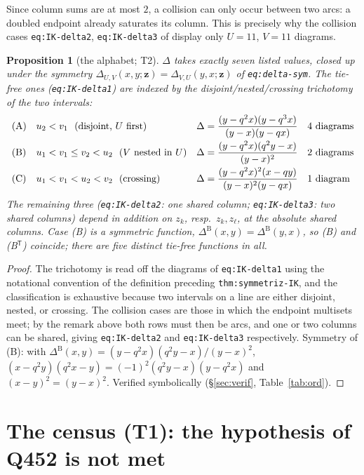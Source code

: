 \documentclass[11pt]{article}
\theoremstyle{plain}
\newtheorem{prop}[thm]{Proposition}
\theoremstyle{definition}
\newcommand{\Dl}{\Delta}
\newcommand{\bz}{\bm{z}}
\begin{document}
Since column sums are at most $2$, a collision can only occur between two arcs:
a doubled endpoint already saturates its column. This is precisely why the
collision cases \texttt{eq:IK-delta2}, \texttt{eq:IK-delta3} of \cite{GGW}
display only $U=11$, $V=11$ diagrams.

\begin{prop}[the alphabet; T2]\label{prop:alphabet}
$\Dl$ takes exactly seven listed values, closed up under the symmetry
$\Dl_{U,V}(x,y;\bz)=\Dl_{V,U}(y,x;\bz)$ of \texttt{eq:delta-sym}. The
\emph{tie-free} ones (\texttt{eq:IK-delta1}) are indexed by the
disjoint/nested/crossing trichotomy of the two intervals:
\[
\begin{array}{llll}
\textup{(A)} & u_2<v_1 \textup{ \ (disjoint, $U$ first)} &
\Dl=\dfrac{(y-q^2x)(y-q^3x)}{(y-x)(y-qx)} & \textup{4 diagrams}\\[3mm]
\textup{(B)} & u_1<v_1\le v_2<u_2 \textup{ \ ($V$ nested in $U$)} &
\Dl=\dfrac{(y-q^2x)(q^2y-x)}{(y-x)^2} & \textup{2 diagrams}\\[3mm]
\textup{(C)} & u_1<v_1<u_2<v_2 \textup{ \ (crossing)} &
\Dl=\dfrac{(y-q^2x)^2(x-qy)}{(y-x)^2(y-qx)} & \textup{1 diagram}
\end{array}
\]
The remaining three (\texttt{eq:IK-delta2}: one shared column; \texttt{eq:IK-delta3}:
two shared columns) depend in addition on $z_k$, resp.\ $z_k,z_\ell$, at the
\emph{absolute} shared columns. Case (B) is a symmetric function,
$\Dl^{\mathrm{B}}(x,y)=\Dl^{\mathrm{B}}(y,x)$, so (B) and (B$^{\mathsf T}$)
coincide; there are five distinct tie-free functions in all.
\end{prop}

\begin{proof}
The trichotomy is read off the diagrams of \texttt{eq:IK-delta1} using the
notational convention of the definition preceding \texttt{thm:symmetriz-IK}, and
the classification is exhaustive because two intervals on a line are either
disjoint, nested, or crossing. The collision cases are those in which the
endpoint multisets meet; by the remark above both rows must then be arcs, and
one or two columns can be shared, giving \texttt{eq:IK-delta2} and
\texttt{eq:IK-delta3} respectively. Symmetry of (B): with
$\Dl^{\mathrm B}(x,y)=(y-q^2x)(q^2y-x)/(y-x)^2$,
$(x-q^2y)(q^2x-y)=(-1)^2(q^2y-x)(y-q^2x)$ and $(x-y)^2=(y-x)^2$.
Verified symbolically (\S\ref{sec:verif}, Table~\ref{tab:ord}).
\end{proof}

\section{The census (T1): the hypothesis of Q452 is not met}
\end{document}
